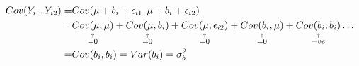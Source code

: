 \documentclass[12pt]{amsart}
\newcommand{\explain}[2]{\underset{\mathclap{\overset{\uparrow}{#2}}}{#1}}
\begin{document}
\begin{equation}
\begin{split}
Cov(Y_{i1}, Y_{i2}) =& Cov(\mu + b_i + \epsilon_{i1} , \mu + b_i + \epsilon_{i2})\\
=& \explain{Cov(\mu, \mu)}{=0} + 
 \explain{Cov(\mu, b_i)}{=0} +
 \explain{Cov(\mu, \epsilon_{i2})}{=0} +
 \explain{Cov(b_i,\mu)}{=0} +
  \explain{Cov(b_i,b_i)}{+ve} \dots\\
  =&  Cov(b_i, b_i) = Var(b_i) = \sigma^2_b\\
\end{split}
\end{equation}




\end{document}
